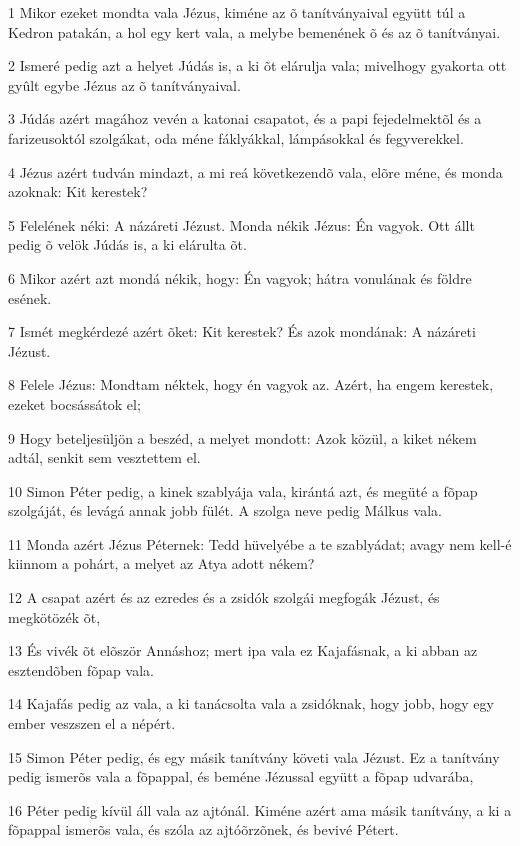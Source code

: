\par 1 Mikor ezeket mondta vala Jézus, kiméne az õ tanítványaival együtt túl a Kedron patakán, a hol egy kert vala, a melybe bemenének  õ és az õ tanítványai.
\par 2 Ismeré pedig azt a helyet Júdás is, a ki õt elárulja vala; mivelhogy gyakorta ott gyûlt egybe Jézus az õ tanítványaival.
\par 3 Júdás azért magához vevén a katonai csapatot, és a papi fejedelmektõl és a farizeusoktól szolgákat, oda méne fáklyákkal, lámpásokkal és fegyverekkel.
\par 4 Jézus azért tudván mindazt, a mi reá következendõ vala, elõre méne, és monda azoknak: Kit kerestek?
\par 5 Felelének néki: A názáreti Jézust. Monda nékik Jézus: Én vagyok. Ott állt pedig õ velök Júdás is, a ki elárulta õt.
\par 6 Mikor azért azt mondá nékik, hogy: Én vagyok; hátra vonulának és földre esének.
\par 7 Ismét megkérdezé azért õket: Kit kerestek? És azok mondának: A názáreti Jézust.
\par 8 Felele Jézus: Mondtam néktek, hogy én vagyok az. Azért, ha engem kerestek, ezeket bocsássátok el;
\par 9 Hogy beteljesüljön a beszéd, a melyet mondott: Azok közül, a kiket nékem adtál, senkit sem vesztettem el.
\par 10 Simon Péter pedig, a kinek szablyája vala, kirántá azt, és megüté a fõpap szolgáját, és levágá annak jobb fülét. A szolga neve pedig Málkus vala.
\par 11 Monda azért Jézus Péternek: Tedd hüvelyébe a te szablyádat; avagy nem kell-é kiinnom a pohárt, a melyet az Atya adott nékem?
\par 12 A csapat azért és az ezredes és a zsidók szolgái megfogák Jézust, és megkötözék õt,
\par 13 És vivék õt elõször Annáshoz; mert ipa vala ez Kajafásnak, a ki abban az esztendõben fõpap vala.
\par 14 Kajafás pedig az vala, a ki tanácsolta vala a zsidóknak, hogy jobb, hogy egy ember veszszen el a népért.
\par 15 Simon Péter pedig, és egy másik tanítvány követi vala Jézust. Ez a tanítvány pedig ismerõs vala a fõpappal, és beméne Jézussal együtt a fõpap udvarába,
\par 16 Péter pedig kívül áll vala az ajtónál. Kiméne azért ama másik tanítvány, a ki a fõpappal ismerõs vala, és szóla az ajtóõrzõnek, és bevivé Pétert.
